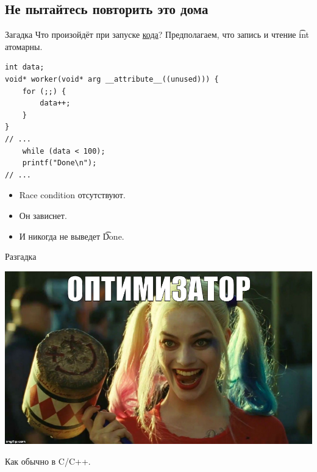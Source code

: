 \subsection{Не пытайтесь повторить это дома}

\begin{frame}
\end{frame}

\begin{frame}[fragile]{Загадка}
	Что произойдёт при запуске \href{https://github.com/yeputons/fall-2016-paradigms/raw/master/161019/sources/12-optimizer.c}{кода}?
	Предполагаем, что запись и чтение \t{int} атомарны.
\begin{verbatim}
int data;
void* worker(void* arg __attribute__((unused))) {
    for (;;) {
        data++;
    }
}
// ...
    while (data < 100);
    printf("Done\n");
// ...
\end{verbatim}
	\begin{itemize}
		\pause\item Race condition отсутствуют.
		\pause\item Он зависнет.
		\pause\item И никогда не выведет \t{Done}.
	\end{itemize}
\end{frame}

\begin{frame}{Разгадка}
	\begin{center}
		\includegraphics[scale=0.3]{optimizer.jpg}
	\end{center}
	Как обычно в C/C++.
\end{frame}

